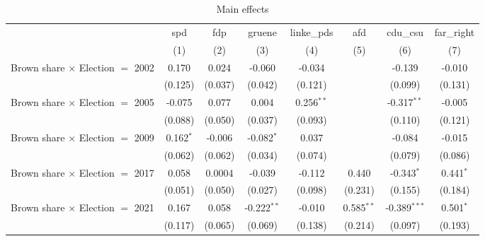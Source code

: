 \begin{table}[htbp]
   \caption{Main effects}
   \centering
   \begin{tabular}{lccccccc}
      \tabularnewline \midrule \midrule
                                                              & spd           & fdp          & gruene         & linke\_pds    & afd            & cdu\_csu       & far\_right\\   
                                                              & (1)           & (2)          & (3)            & (4)           & (5)            & (6)            & (7)\\  
      Brown share $\times$ Election $=$ 2002                  & 0.170         & 0.024        & -0.060         & -0.034        &                & -0.139         & -0.010\\   
                                                              & (0.125)       & (0.037)      & (0.042)        & (0.121)       &                & (0.099)        & (0.131)\\   
      Brown share $\times$ Election $=$ 2005                  & -0.075        & 0.077        & 0.004          & 0.256$^{**}$  &                & -0.317$^{**}$  & -0.005\\   
                                                              & (0.088)       & (0.050)      & (0.037)        & (0.093)       &                & (0.110)        & (0.121)\\   
      Brown share $\times$ Election $=$ 2009                  & 0.162$^{*}$   & -0.006       & -0.082$^{*}$   & 0.037         &                & -0.084         & -0.015\\   
                                                              & (0.062)       & (0.062)      & (0.034)        & (0.074)       &                & (0.079)        & (0.086)\\   
      Brown share $\times$ Election $=$ 2017                  & 0.058         & 0.0004       & -0.039         & -0.112        & 0.440          & -0.343$^{*}$   & 0.441$^{*}$\\   
                                                              & (0.051)       & (0.050)      & (0.027)        & (0.098)       & (0.231)        & (0.155)        & (0.184)\\   
      Brown share $\times$ Election $=$ 2021                  & 0.167         & 0.058        & -0.222$^{**}$  & -0.010        & 0.585$^{**}$   & -0.389$^{***}$ & 0.501$^{*}$\\   
                                                              & (0.117)       & (0.065)      & (0.069)        & (0.138)       & (0.214)        & (0.097)        & (0.193)\\   

\end{tabular}
\end{table}
